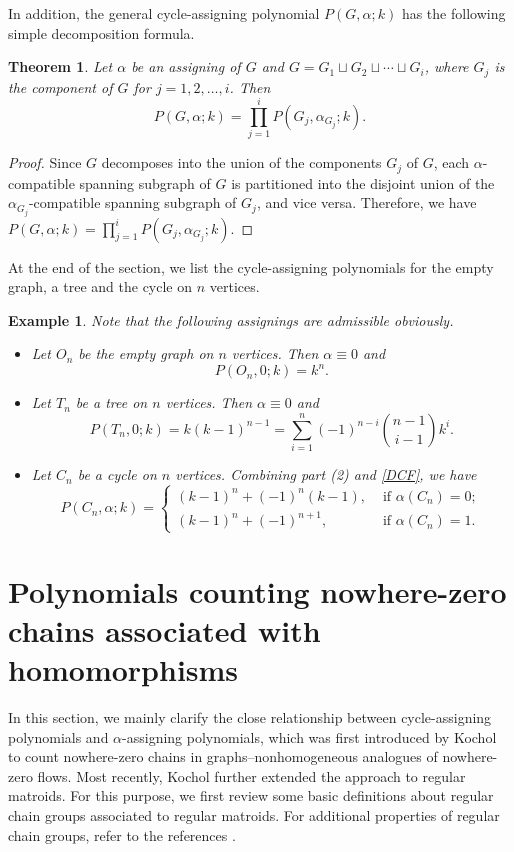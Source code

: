 \documentclass[12pt]{article}%
\numberwithin{equation}{section}
\newtheorem{theorem}{Theorem}[section]
\newtheorem{example}[example]{Example}
\begin{document}
In addition, the general cycle-assigning polynomial $P(G,\alpha;k)$ has the following simple decomposition formula.
\begin{theorem}\label{Decomposition}
Let $\alpha$ be an assigning of $G$ and $G=G_1\sqcup G_2\sqcup\cdots\sqcup G_i$, where $G_j$ is the component of $G$ for $j=1,2,\ldots,i$. Then
\[
P(G,\alpha;k)=\prod_{j=1}^iP(G_j,\alpha_{G_j};k).
\]
\end{theorem}
\begin{proof}
Since $G$ decomposes into the union of the components $G_j$ of $G$, each $\alpha$-compatible spanning subgraph of $G$ is partitioned into the disjoint union of the $\alpha_{G_j}$-compatible spanning subgraph of $G_j$, and vice versa. Therefore, we have $P(G,\alpha;k)=\prod_{j=1}^iP(G_j,\alpha_{G_j};k)$.
\end{proof}
At the end of the section, we list the cycle-assigning polynomials for the empty graph, a tree and the cycle on $n$ vertices.
\begin{example}
{\rm Note that the following assignings are admissible obviously.
\begin{itemize}
\item [{\rm(1)}] Let $O_n$ be the empty graph on $n$ vertices. Then $\alpha\equiv0$ and
\[
P(O_n,0;k)=k^n.
\]
\item [{\rm(2)}] Let $T_n$ be a tree on $n$ vertices. Then $\alpha\equiv0$ and
\[
P(T_n,0;k)=k(k-1)^{n-1}=\sum_{i=1}^n(-1)^{n-i}\binom{n-1}{i-1}k^i.
\]
\item [{\rm(3)}] Let $C_n$ be a cycle on $n$ vertices. Combining part (2) and \autoref{DCF}, we have
\[
P(C_n,\alpha;k)=
\begin{cases}
(k-1)^n+(-1)^n(k-1),&\mbox{ if } \alpha(C_n)=0;\\
(k-1)^n+(-1)^{n+1},&\mbox{ if } \alpha(C_n)=1.
\end{cases}
\]
\end{itemize}
}
\end{example}
\section{Polynomials counting nowhere-zero chains associated with homomorphisms}\label{Sec3-0}
In this section, we mainly clarify the close relationship between cycle-assigning polynomials and $\alpha$-assigning polynomials, which was first introduced by Kochol \cite{Kochol2022} to count nowhere-zero chains in graphs--nonhomogeneous analogues of nowhere-zero flows. Most recently,  Kochol \cite{Kochol2024} further extended the approach to regular matroids.  For this purpose, we first review some basic definitions about regular chain groups associated to regular matroids. For additional properties of regular chain groups, refer to the references  \cite{Arrowsmith-Jaeger1982,Tutte1956}.
\end{document}
